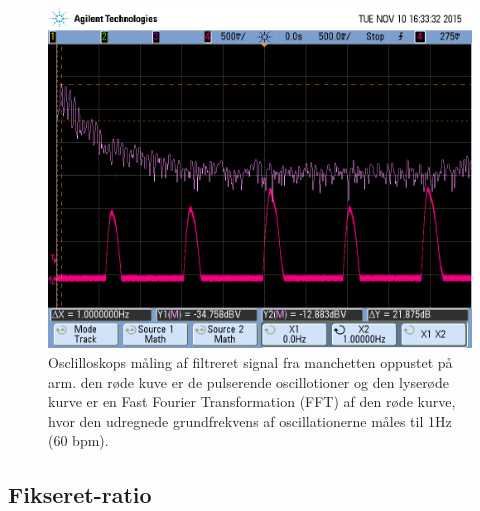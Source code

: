 \begin{figure}[H]
	\centering
	\includegraphics[trim={0 0 0 1.5cm},clip, width=1\textwidth]{billeder/filteredPulseSignalWithFFT.png}
	\caption{Osclilloskops måling af filtreret signal fra manchetten oppustet på arm. den røde kuve er de pulserende oscillotioner og den lyserøde kurve er en Fast Fourier Transformation (FFT) af den røde kurve, hvor den udregnede grundfrekvens af oscillationerne måles til 1Hz (60 bpm).}\label{fig:filteredPulseSignalWithFFT}
\end{figure}


\subsection{Fikseret-ratio} \label{Fikseret-ratio}